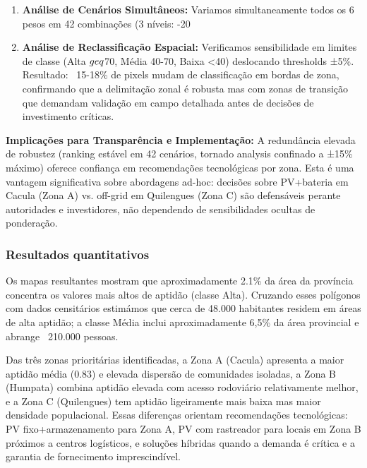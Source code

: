 \documentclass[12pt, a4paper]{article}
\begin{document}
{{{{{{{{{{{{\begin{enumerate}
  \item \textbf{Análise de Cenários Simultâneos:} Variamos simultaneamente todos os 6 pesos em 42 combinações (3 níveis: -20%

  \item \textbf{Análise de Reclassificação Espacial:} Verificamos sensibilidade em limites de classe (Alta $\\geq$70, Média 40-70, Baixa <40) deslocando thresholds ±5\%. Resultado: ~15-18\% de pixels mudam de classificação em bordas de zona, confirmando que a delimitação zonal é robusta mas com zonas de transição que demandam validação em campo detalhada antes de decisões de investimento críticas.
\end{enumerate}

\noindent \textbf{Implicações para Transparência e Implementação:} A redundância elevada de robustez (ranking estável em 42 cenários, tornado analysis confinado a ±15\% máximo) oferece confiança em recomendações tecnológicas por zona. Esta é uma vantagem significativa sobre abordagens ad-hoc: decisões sobre PV+bateria em Cacula (Zona A) vs. off-grid em Quilengues (Zona C) são defensáveis perante autoridades e investidores, não dependendo de sensibilidades ocultas de ponderação.

\subsubsection{Resultados quantitativos}

Os mapas resultantes mostram que aproximadamente 2.1\% da área da província concentra os valores mais altos de aptidão (classe Alta). Cruzando esses polígonos com dados censitários estimámos que cerca de 48.000 habitantes residem em áreas de alta aptidão; a classe Média inclui aproximadamente 6,5\% da área provincial e abrange ~210.000 pessoas.

Das três zonas prioritárias identificadas, a Zona A (Cacula) apresenta a maior aptidão média (0.83) e elevada dispersão de comunidades isoladas, a Zona B (Humpata) combina aptidão elevada com acesso rodoviário relativamente melhor, e a Zona C (Quilengues) tem aptidão ligeiramente mais baixa mas maior densidade populacional. Essas diferenças orientam recomendações tecnológicas: PV fixo+armazenamento para Zona A, PV com rastreador para locais em Zona B próximos a centros logísticos, e soluções híbridas quando a demanda é crítica e a garantia de fornecimento imprescindível.

}}}}}}}}}}}}
\end{document}
